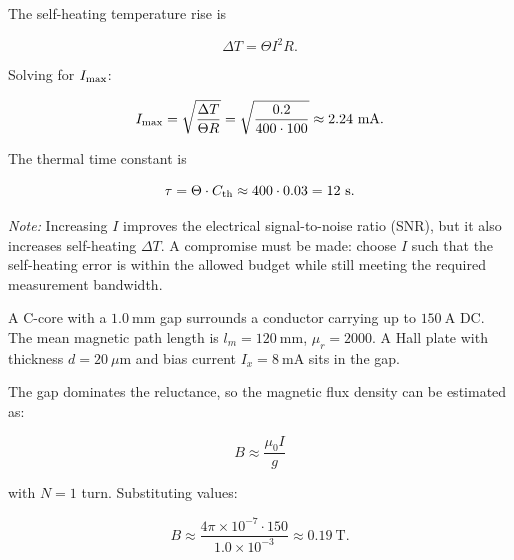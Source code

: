 

\begin{solutionblock}
The self-heating temperature rise is

\[
\Delta T = \Theta I^2 R.
\]

Solving for $I_{\rm max}$:

\[
I_{\rm max} = \sqrt{\frac{\Delta T}{\Theta R}}
             = \sqrt{\frac{0.2}{400 \cdot 100}}
             \approx 2.24~\text{mA}.
\]
\end{solutionblock}




\begin{solutionblock}
The thermal time constant is

\[
\tau = \Theta \cdot C_{\rm th} \approx 400 \cdot 0.03 = 12~\text{s}.
\]

\textit{Note:} Increasing $I$ improves the electrical signal-to-noise ratio (SNR), but it also increases self-heating $\Delta T$. A compromise must be made: choose $I$ such that the self-heating error is within the allowed budget while still meeting the required measurement bandwidth.
\end{solutionblock}





A C-core with a $1.0~\text{mm}$ gap surrounds a conductor carrying up to $150~\text{A}$ DC. The mean magnetic path length is $l_m = 120~\text{mm}$, $\mu_r = 2000$. A Hall plate with thickness $d = 20~\mu\text{m}$ and bias current $I_x = 8~\text{mA}$ sits in the gap.



\begin{solutionblock}
The gap dominates the reluctance, so the magnetic flux density can be estimated as:

\[
B \approx \frac{\mu_0 I}{g}
\]

with $N = 1$ turn. Substituting values:

\[
B \approx \frac{4\pi \times 10^{-7} \cdot 150}{1.0\times 10^{-3}} \approx 0.19~\text{T}.
\]
\end{solutionblock}


